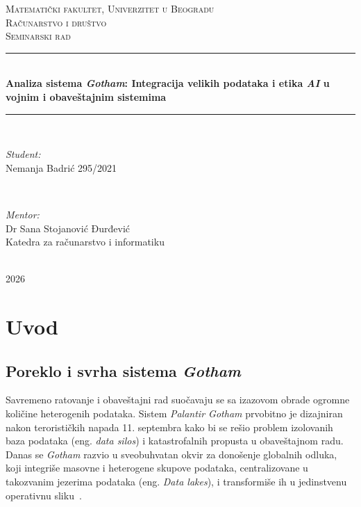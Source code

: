 ﻿\documentclass[12pt]{article}
\begin{document}
\begin{titlepage}
\newcommand{\HRule}{\rule{\linewidth}{0.5mm}}
\center

\textsc{\LARGE Matematički fakultet, Univerzitet u Beogradu}\\[1.5cm]
\textsc{\Large Računarstvo i društvo}\\[0.5cm]
\textsc{\large Seminarski rad}\\[0.5cm]

\HRule \\[0.4cm]
{ \huge \bfseries Analiza sistema \textit{Gotham}: Integracija velikih podataka i etika \textit{AI} u vojnim i obaveštajnim sistemima}\\[0.4cm]
\HRule \\[1.5cm]

\begin{minipage}{0.4\textwidth}
\begin{flushleft} \large
\emph{Student:}\\
Nemanja Badrić 295/2021
\end{flushleft}
\end{minipage}
~
\begin{minipage}{0.4\textwidth}
\begin{flushright} \large
\emph{Mentor:} \\
Dr Sana Stojanović Đurđević\\
Katedra za računarstvo i informatiku
\end{flushright}
\end{minipage}\\[1.5cm]

{\large 2026}\\[2cm]

\vfill
\end{titlepage}

\newpage
\tableofcontents
\newpage

\section{Uvod}

\subsection{Poreklo i svrha sistema \textit{Gotham}}

Savremeno ratovanje i obaveštajni rad suočavaju se sa izazovom obrade ogromne količine heterogenih podataka.
Sistem \textit{Palantir Gotham} prvobitno je dizajniran nakon terorističkih napada 11. septembra kako bi se rešio problem izolovanih baza podataka (eng. \textit{data silos}) i katastrofalnih propusta u obaveštajnom radu.
Danas se \textit{Gotham} razvio u sveobuhvatan okvir za donošenje globalnih odluka, koji integriše masovne i heterogene skupove podataka, centralizovane u takozvanim jezerima podataka (eng. \textit{Data lakes}), i transformiše ih u jedinstvenu operativnu sliku~\cite{wei2024brief}.
\end{document}
